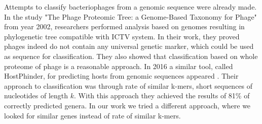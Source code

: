 Attempts to classify bacteriophages from a genomic sequence were already made.
In the study "The Phage Proteomic Tree: a Genome-Based Taxonomy for Phage"\cite{phage} from year 2002, researchers performed analysis based on genomes resulting in phylogenetic tree compatible with ICTV system.
In their work, they proved phages indeed do not contain any universal genetic marker, which could be used as sequence for classification.
They also showed that classification based on whole proteome of phage is a reasonable approach.
In 2016 a similar tool, called HostPhinder, for predicting hosts from genomic sequences appeared \cite{hostphinder}.
Their approach to classification was through rate of similar k-mers, short sequences of nucleotides of length $k$.
With this approach they achieved the results of 81\% of correctly predicted genera.
In our work we tried a different approach, where we looked for similar genes instead of rate of similar k-mers.

